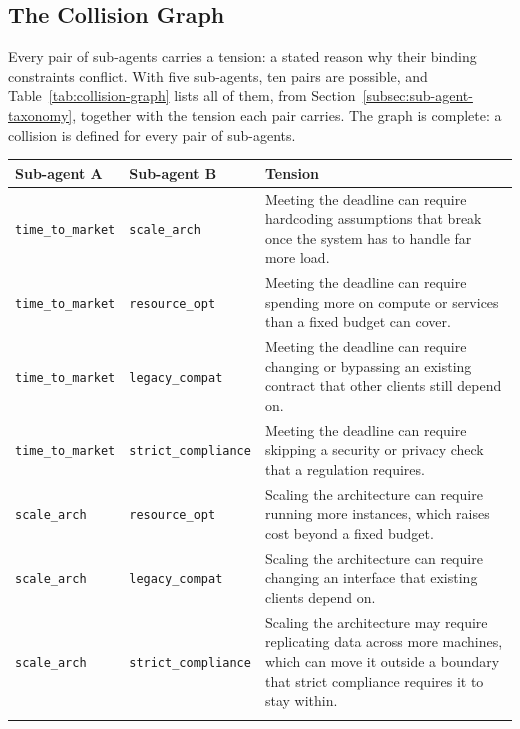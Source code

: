 \clearpage
\subsection{The Collision Graph}
\label{subsec:collision-graph}

Every pair of sub-agents carries a tension: a stated reason why their binding constraints conflict. With five sub-agents, ten pairs are possible, and Table~\ref{tab:collision-graph} lists all of them, from Section~\ref{subsec:sub-agent-taxonomy}, together with the tension each pair carries. The graph is complete: a collision is defined for every pair of sub-agents.

\vspace*{\fill}
\begin{table}[H]
    \centering
    \begin{tabular}{@{}ll>{\raggedright\hyphenpenalty=10000\exhyphenpenalty=10000\arraybackslash}m{9.5cm}@{}}
        \toprule
        \textbf{Sub-agent A} & \textbf{Sub-agent B} & \textbf{Tension} \\
        \midrule
        \texttt{time\_to\_market} & \texttt{scale\_arch} & Meeting the deadline can require hardcoding assumptions that break once the system has to handle far more load. \\ \addlinespace[0.9em]
        \texttt{time\_to\_market} & \texttt{resource\_opt} & Meeting the deadline can require spending more on compute or services than a fixed budget can cover. \\ \addlinespace[0.9em]
        \texttt{time\_to\_market} & \texttt{legacy\_compat} & Meeting the deadline can require changing or bypassing an existing contract that other clients still depend on. \\ \addlinespace[0.9em]
        \texttt{time\_to\_market} & \texttt{strict\_compliance} & Meeting the deadline can require skipping a security or privacy check that a regulation requires. \\ \addlinespace[0.9em]
        \texttt{scale\_arch} & \texttt{resource\_opt} & Scaling the architecture can require running more instances, which raises cost beyond a fixed budget. \\ \addlinespace[0.9em]
        \texttt{scale\_arch} & \texttt{legacy\_compat} & Scaling the architecture can require changing an interface that existing clients depend on. \\ \addlinespace[0.9em]
        \texttt{scale\_arch} & \texttt{strict\_compliance} & Scaling the architecture may require replicating data across more machines, which can move it outside a boundary that strict compliance requires it to stay within. \\ \addlinespace[0.9em]

\end{tabular}
\end{table}
